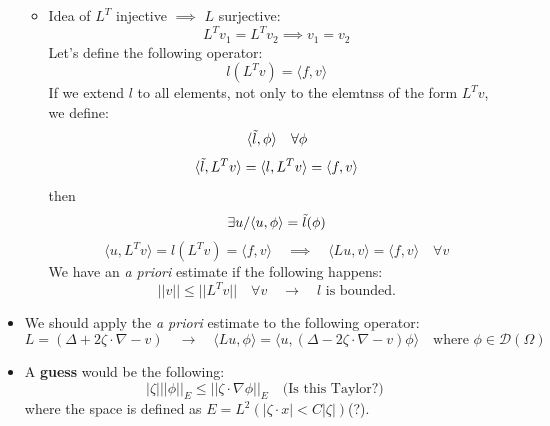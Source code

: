 \documentclass{article}
\begin{document}
\begin{itemize}
\begin{itemize}
        \item Idea of $L^T$ injective $\implies$ $L$ surjective:
        \begin{equation}
            L^T v_1 =L^T v_2 \implies v_1 = v_2
        \end{equation}
        Let's define the following operator:
        \begin{equation}
            l(L^T v) = \langle f, v \rangle
        \end{equation}
        If we extend $l$ to all elements, not only to the elemtnss of the form $L^T v$, we define:
        \begin{equation}
            \langle \Tilde{l} , \phi \rangle \quad \forall \phi
        \end{equation}
        \begin{equation}
            \langle \Tilde{l} , L^T v \rangle = \langle l, L^T v \rangle = \langle f, v \rangle
        \end{equation}
        then 
        \begin{equation}
            \exists u / \langle u, \phi \rangle = \Tilde{l}(\phi)
        \end{equation}
        \begin{equation}
            \langle u, L^T v \rangle = l(L^T v) = \langle f, v \rangle \quad \implies \quad \langle Lu, v \rangle = \langle f , v \rangle \quad \forall v
        \end{equation}
        We have an \textit{a priori} estimate if the following happens:
        \begin{equation}
            ||v|| \leq ||L^T v|| \quad \forall v \quad \rightarrow \quad l \text{ is bounded.}
        \end{equation}
    \end{itemize}

    \item We should apply the \textit{a priori} estimate to the following operator:
    \begin{equation}
       L = (\Delta + 2 \zeta \cdot \nabla - v) \quad \rightarrow \quad \langle Lu, \phi \rangle = \langle u, (\Delta - 2 \zeta \cdot \nabla - v)\phi \rangle \quad \text{where } \phi \in \mathcal{D}(\Omega)
    \end{equation}

    \item A \textbf{guess} would be the following:
    \begin{equation}
        |\zeta|||\phi||_E \leq ||\zeta \cdot \nabla \phi||_E \quad \text{(Is this Taylor?)}
    \end{equation}
    where the space is defined as $E = L^2(|\zeta \cdot x| < C |\zeta|)$(?).
\end{itemize}
\end{document}
